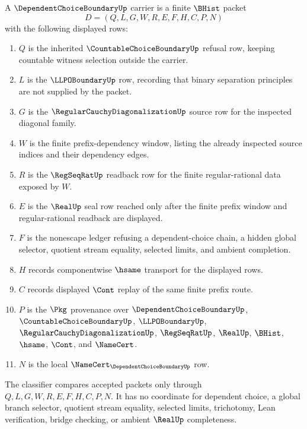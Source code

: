 \begin{definition}
\label{def:dependent-choice-boundary-carrier}
A $\DependentChoiceBoundaryUp$ carrier is a finite $\BHist$ packet
$$
D=(Q,L,G,W,R,E,F,H,C,P,N)
$$
with the following displayed rows:
\begin{enumerate}
\item $Q$ is the inherited $\CountableChoiceBoundaryUp$ refusal row, keeping countable witness selection outside the carrier.
\item $L$ is the $\LLPOBoundaryUp$ row, recording that binary separation principles are not supplied by the packet.
\item $G$ is the $\RegularCauchyDiagonalizationUp$ source row for the inspected diagonal family.
\item $W$ is the finite prefix-dependency window, listing the already inspected source indices and their dependency edges.
\item $R$ is the $\RegSeqRatUp$ readback row for the finite regular-rational data exposed by $W$.
\item $E$ is the $\RealUp$ seal row reached only after the finite prefix window and regular-rational readback are displayed.
\item $F$ is the nonescape ledger refusing a dependent-choice chain, a hidden global selector, quotient stream equality, selected limits, and ambient completion.
\item $H$ records componentwise $\hsame$ transport for the displayed rows.
\item $C$ records displayed $\Cont$ replay of the same finite prefix route.
\item $P$ is the $\Pkg$ provenance over $\DependentChoiceBoundaryUp$, $\CountableChoiceBoundaryUp$, $\LLPOBoundaryUp$, $\RegularCauchyDiagonalizationUp$, $\RegSeqRatUp$, $\RealUp$, $\BHist$, $\hsame$, $\Cont$, and $\NameCert$.
\item $N$ is the local $\NameCert_{\DependentChoiceBoundaryUp}$ row.
\end{enumerate}
The classifier compares accepted packets only through $Q,L,G,W,R,E,F,H,C,P,N$. It has no coordinate for dependent choice, a global branch selector, quotient stream equality, selected limits, trichotomy, Lean verification, bridge checking, or ambient $\RealUp$ completeness.
\end{definition}

